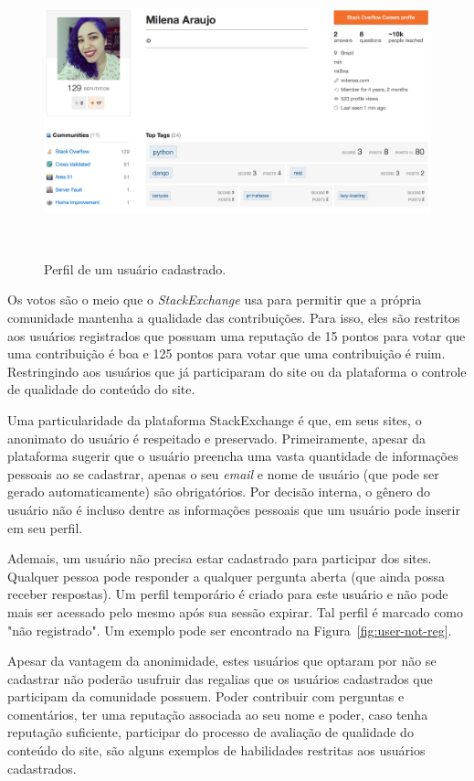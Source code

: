 \begin{figure}[!b]
  \includegraphics[width=1\columnwidth]{figures/user.png}
  \caption[Perfil de um usuário cadastrado]{Perfil de um usuário cadastrado.}~\label{fig:user-reg}
\end{figure}

Os votos são o meio que o \emph{StackExchange} usa para permitir que a própria comunidade mantenha a qualidade das contribuições. Para isso, eles são restritos aos usuários registrados que possuam uma reputação de 15 pontos para votar que uma contribuição é boa e 125 pontos para votar que uma contribuição é ruim. Restringindo aos usuários que já participaram do site ou da plataforma o controle de qualidade do conteúdo do site.

Uma particularidade da plataforma StackExchange é que, em seus sites, o anonimato do usuário é respeitado e preservado. Primeiramente, apesar da plataforma sugerir que o usuário preencha uma vasta quantidade de informações pessoais ao se cadastrar, apenas o seu \emph{email} e nome de usuário (que pode ser gerado automaticamente) são obrigatórios. Por decisão interna, o gênero do usuário não é incluso dentre as informações pessoais que um usuário pode inserir em seu perfil.

Ademais, um usuário não precisa estar cadastrado para participar dos sites. Qualquer pessoa pode responder a qualquer pergunta aberta (que ainda possa receber respostas). Um perfil temporário é criado para este usuário e não pode mais ser acessado pelo mesmo após sua sessão expirar. Tal perfil é marcado como "não registrado". Um exemplo pode ser encontrado na Figura~\ref{fig:user-not-reg}.

Apesar da vantagem da anonimidade, estes usuários que optaram por não se cadastrar não poderão usufruir das regalias que os usuários cadastrados que participam da comunidade possuem. Poder contribuir com perguntas e comentários, ter uma reputação associada ao seu nome e poder, caso tenha reputação suficiente, participar do processo de avaliação de qualidade do conteúdo do site, são alguns exemplos de habilidades restritas aos usuários cadastrados.

